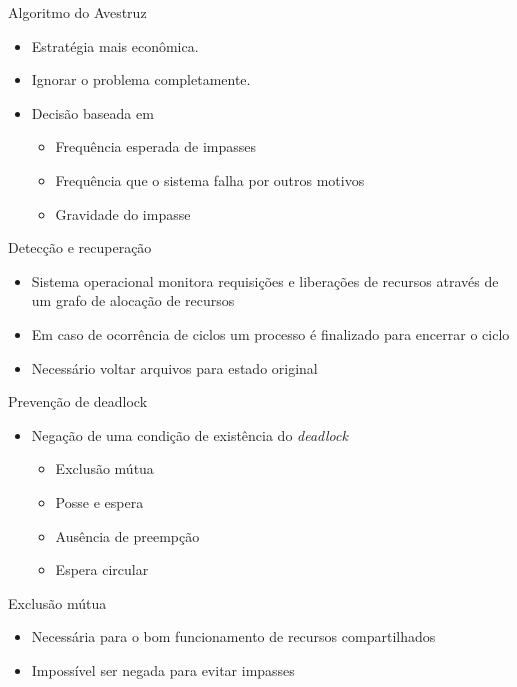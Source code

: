 \documentclass[aspectratio=169,
				xcolor=table]{beamer}
\begin{document}
	\begin{frame}{Algoritmo do Avestruz}
		\begin{itemize}
			\item Estratégia mais econômica.
			\vspace{1em}
			\item Ignorar o problema completamente.
			\vspace{1em}
			\item Decisão baseada em 
			\begin{itemize}
				\item Frequência esperada de impasses
				\item Frequência que o sistema falha por outros motivos
				\item Gravidade do impasse
			\end{itemize}
		\end{itemize}		
	\end{frame}
	
	\begin{frame}{Detecção e recuperação}
		\begin{itemize}
			\item Sistema operacional monitora requisições e liberações de recursos através de um grafo de alocação de recursos
			\vspace{1em}
			\item Em caso de ocorrência de ciclos um processo é finalizado para encerrar o ciclo
			\vspace{1em}
			\item Necessário voltar arquivos para estado original
		\end{itemize}
	\end{frame}
	
	\begin{frame}{Prevenção de deadlock}
		\begin{itemize}
			\item Negação de uma condição de existência do \textit{deadlock}
			\begin{itemize}
				\item Exclusão mútua
				\item Posse e espera
				\item Ausência de preempção
				\item Espera circular
			\end{itemize}
		\end{itemize}
	\end{frame}
	
	\begin{frame}{Exclusão mútua}
		\begin{itemize}
			\item Necessária para o bom funcionamento de recursos compartilhados
			\vspace{1em}
			\item Impossível ser negada para evitar impasses
		\end{itemize}
	\end{frame}
	
\end{document}
